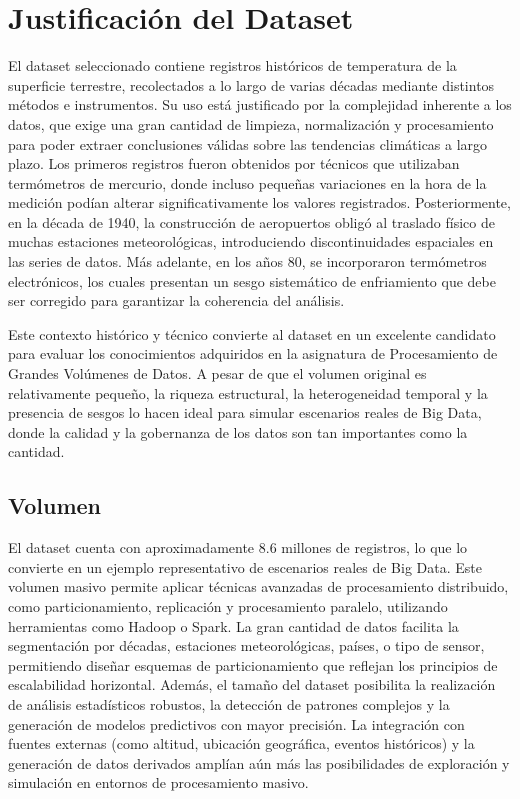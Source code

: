 \documentclass[12pt,a4paper]{scrartcl}
\begin{document}
\section{Justificación del Dataset}

El dataset seleccionado contiene registros históricos de temperatura de la superficie terrestre, recolectados a lo largo de varias décadas mediante distintos métodos e instrumentos. Su uso está justificado por la complejidad inherente a los datos, que exige una gran cantidad de limpieza, normalización y procesamiento para poder extraer conclusiones válidas sobre las tendencias climáticas a largo plazo. Los primeros registros fueron obtenidos por técnicos que utilizaban termómetros de mercurio, donde incluso pequeñas variaciones en la hora de la medición podían alterar significativamente los valores registrados. Posteriormente, en la década de 1940, la construcción de aeropuertos obligó al traslado físico de muchas estaciones meteorológicas, introduciendo discontinuidades espaciales en las series de datos. Más adelante, en los años 80, se incorporaron termómetros electrónicos, los cuales presentan un sesgo sistemático de enfriamiento que debe ser corregido para garantizar la coherencia del análisis.

Este contexto histórico y técnico convierte al dataset en un excelente candidato para evaluar los conocimientos adquiridos en la asignatura de Procesamiento de Grandes Volúmenes de Datos. A pesar de que el volumen original es relativamente pequeño, la riqueza estructural, la heterogeneidad temporal y la presencia de sesgos lo hacen ideal para simular escenarios reales de Big Data, donde la calidad y la gobernanza de los datos son tan importantes como la cantidad.

\subsection{Volumen}

El dataset cuenta con aproximadamente 8.6 millones de registros, lo que lo convierte en un ejemplo representativo de escenarios reales de Big Data. Este volumen masivo permite aplicar técnicas avanzadas de procesamiento distribuido, como particionamiento, replicación y procesamiento paralelo, utilizando herramientas como Hadoop o Spark. La gran cantidad de datos facilita la segmentación por décadas, estaciones meteorológicas, países, o tipo de sensor, permitiendo diseñar esquemas de particionamiento que reflejan los principios de escalabilidad horizontal. Además, el tamaño del dataset posibilita la realización de análisis estadísticos robustos, la detección de patrones complejos y la generación de modelos predictivos con mayor precisión. La integración con fuentes externas (como altitud, ubicación geográfica, eventos históricos) y la generación de datos derivados amplían aún más las posibilidades de exploración y simulación en entornos de procesamiento masivo.
\end{document}
